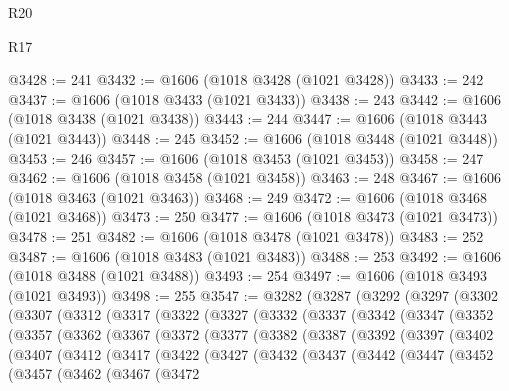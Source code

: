 \begin{lexlean}{R20}
\begin{lexlean}{R17}
\begin{coremodule}
{{{{{{{{{{{{{{{{{{{{{{{{{{{{{{{{{{{{{{{{{{{{{{{{{{{{{{{{{{{{{{{{{{{{{{{{{{{{{{{{{{{{{{{{{{{{{{{{{{{{{{{{{{{@3428 := 241
@3432 := @1606 (@1018 @3428 (@1021 @3428))
@3433 := 242
@3437 := @1606 (@1018 @3433 (@1021 @3433))
@3438 := 243
@3442 := @1606 (@1018 @3438 (@1021 @3438))
@3443 := 244
@3447 := @1606 (@1018 @3443 (@1021 @3443))
@3448 := 245
@3452 := @1606 (@1018 @3448 (@1021 @3448))
@3453 := 246
@3457 := @1606 (@1018 @3453 (@1021 @3453))
@3458 := 247
@3462 := @1606 (@1018 @3458 (@1021 @3458))
@3463 := 248
@3467 := @1606 (@1018 @3463 (@1021 @3463))
@3468 := 249
@3472 := @1606 (@1018 @3468 (@1021 @3468))
@3473 := 250
@3477 := @1606 (@1018 @3473 (@1021 @3473))
@3478 := 251
@3482 := @1606 (@1018 @3478 (@1021 @3478))
@3483 := 252
@3487 := @1606 (@1018 @3483 (@1021 @3483))
@3488 := 253
@3492 := @1606 (@1018 @3488 (@1021 @3488))
@3493 := 254
@3497 := @1606 (@1018 @3493 (@1021 @3493))
@3498 := 255
@3547 := @3282
    (@3287
      (@3292
        (@3297
          (@3302
            (@3307
              (@3312
                (@3317
                  (@3322
                    (@3327
                      (@3332
                        (@3337
                          (@3342
                            (@3347
                              (@3352
                                (@3357
                                  (@3362
                                    (@3367
                                      (@3372
                                        (@3377
                                          (@3382
                                            (@3387
                                              (@3392
                                                (@3397
                                                  (@3402
                                                    (@3407
                                                      (@3412
                                                        (@3417
                                                          (@3422
                                                            (@3427
                                                              (@3432
                                                                (@3437
                                                                  (@3442
                                                                    (@3447
                                                                      (@3452
                                                                        (@3457
                                                                          (@3462
                                                                            (@3467
                                                                              (@3472
}}}}}}}}}}}}}}}}}}}}}}}}}}}}}}}}}}}}}}}}}}}}}}}}}}}}}}}}}}}}}}}}}}}}}}}}}}}}}}}}}}}}}}}}}}}}}}}}}}}}}}}}}}}
\end{coremodule}
\end{lexlean}
\end{lexlean}
